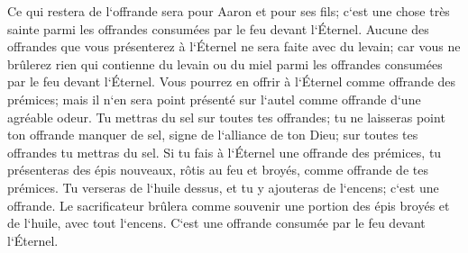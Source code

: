 \verse Ce qui restera de l`offrande sera pour Aaron et pour ses fils; c`est une chose très sainte parmi les offrandes consumées par le feu devant l`Éternel. 
\verse Aucune des offrandes que vous présenterez à l`Éternel ne sera faite avec du levain; car vous ne brûlerez rien qui contienne du levain ou du miel parmi les offrandes consumées par le feu devant l`Éternel. 
\verse Vous pourrez en offrir à l`Éternel comme offrande des prémices; mais il n`en sera point présenté sur l`autel comme offrande d`une agréable odeur. 
\verse Tu mettras du sel sur toutes tes offrandes; tu ne laisseras point ton offrande manquer de sel, signe de l`alliance de ton Dieu; sur toutes tes offrandes tu mettras du sel. 
\verse Si tu fais à l`Éternel une offrande des prémices, tu présenteras des épis nouveaux, rôtis au feu et broyés, comme offrande de tes prémices. 
\verse Tu verseras de l`huile dessus, et tu y ajouteras de l`encens; c`est une offrande. 
\verse Le sacrificateur brûlera comme souvenir une portion des épis broyés et de l`huile, avec tout l`encens. C`est une offrande consumée par le feu devant l`Éternel. 

